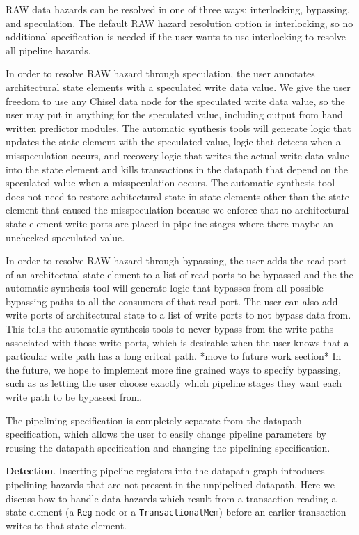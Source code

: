 RAW data hazards can be resolved in one of three ways: interlocking,
bypassing, and speculation. The default RAW hazard resolution option
is interlocking, so no additional specification is needed if the user
wants to use interlocking to resolve all pipeline hazards.

In order to resolve RAW hazard through speculation, the user annotates
architectural state elements with a speculated write data value. We
give the user freedom to use any Chisel data node for the speculated
write data value, so the user may put in anything for the speculated
value, including output from hand written predictor modules. The
automatic synthesis tools will generate logic that updates the state
element with the speculated value, logic that detects when a
misspeculation occurs, and recovery logic that writes the actual write
data value into the state element and kills transactions in the
datapath that depend on the speculated value when a misspeculation
occurs. The automatic synthesis tool does not need to restore
achitectural state in state elements other than the state element that
caused the misspeculation because we enforce that no architectural
state element write ports are placed in pipeline stages where there
maybe an unchecked speculated value. 

In order to resolve RAW hazard through bypassing, the user adds the
read port of an architectual state element to a list of read ports to
be bypassed and the the automatic synthesis tool will generate logic
that bypasses from all possible bypassing paths to all the consumers
of that read port. The user can also
add write ports of architectural state to a list of write ports to not
bypass data from. This tells the automatic synthesis tools to never
bypass from the write paths associated with those write ports, which
is desirable when the user knows that a particular write path has a
long critcal path. *move to future work section* In the future, we
hope to implement more fine grained ways to specify bypassing, such as
as letting the user choose exactly which pipeline stages they want
each write path to be bypassed from.

The pipelining specification is completely separate from the datapath
specification, which allows the user to easily change pipeline
parameters by reusing the datapath specification and changing the
pipelining specification.

{\bf Detection}. Inserting pipeline registers into the datapath
graph introduces pipelining hazards that are not present in the
unpipelined datapath. Here we discuss how to handle data hazards which
result from a transaction reading a state element (a {\tt Reg} node or a
{\tt TransactionalMem}) before an earlier transaction writes to that state
element. 

